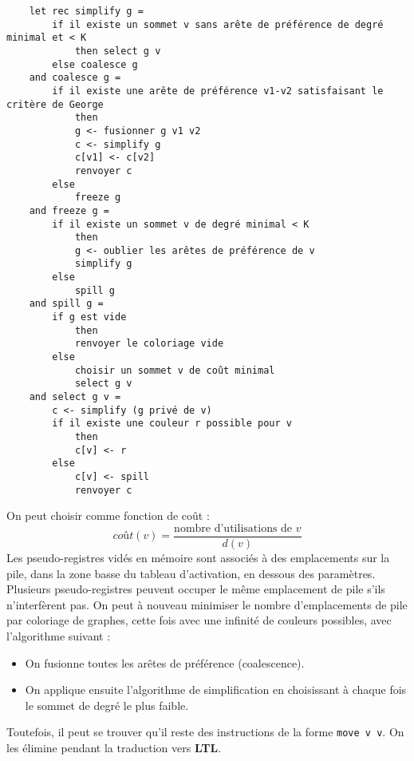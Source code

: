 \documentclass{cours}
\begin{document}
\begin{verbatim}
    let rec simplify g =
        if il existe un sommet v sans arête de préférence de degré minimal et < K
            then select g v
        else coalesce g
    and coalesce g =
        if il existe une arête de préférence v1-v2 satisfaisant le critère de George
            then
            g <- fusionner g v1 v2
            c <- simplify g
            c[v1] <- c[v2]
            renvoyer c
        else
            freeze g
    and freeze g =
        if il existe un sommet v de degré minimal < K
            then
            g <- oublier les arêtes de préférence de v
            simplify g
        else
            spill g
    and spill g =
        if g est vide
            then
            renvoyer le coloriage vide
        else
            choisir un sommet v de coût minimal
            select g v
    and select g v =
        c <- simplify (g privé de v)
        if il existe une couleur r possible pour v
            then
            c[v] <- r
        else
            c[v] <- spill
            renvoyer c
\end{verbatim}
On peut choisir comme fonction de coût :
\[
    coût(v) = \frac{\text{nombre d'utilisations de } v}{d(v)}
\]
Les pseudo-registres vidés en mémoire sont associés à des emplacements sur la pile, dans la zone basse du tableau d'activation, en dessous des paramètres. Plusieurs pseudo-registres peuvent occuper le même emplacement de pile s'ils n'interfèrent pas. On peut à nouveau minimiser le nombre d'emplacements de pile par coloriage de graphes, cette fois avec une infinité de couleurs possibles, avec l'algorithme suivant :
\begin{itemize}
    \item On fusionne toutes les arêtes de préférence (coalescence).
    \item On applique ensuite l'algorithme de simplification en choisissant à chaque fois le sommet de degré le plus faible.
\end{itemize}

Toutefois, il peut se trouver qu'il reste des instructions de la forme \texttt{move v v}. On les élimine pendant la traduction vers {\bf LTL}.\\
\end{document}
